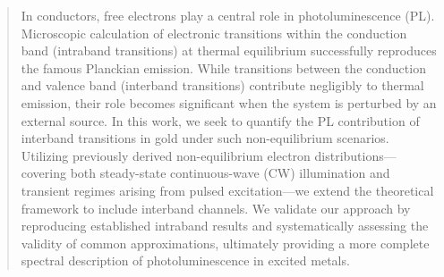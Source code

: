 \begin{abstract}
In conductors, free electrons play a central role in photoluminescence (PL). Microscopic calculation of electronic transitions within the conduction band (intraband transitions) at thermal equilibrium successfully reproduces the famous Planckian emission. While transitions between the conduction and valence band (interband transitions) contribute negligibly to thermal emission, their role becomes significant when the system is perturbed by an external source. In this work, we seek to quantify the PL contribution of interband transitions in gold under such non-equilibrium scenarios. Utilizing previously derived non-equilibrium electron distributions---covering both steady-state continuous-wave (CW) illumination and transient regimes arising from pulsed excitation---we extend the theoretical framework to include interband channels. We validate our approach by reproducing established intraband results and systematically assessing the validity of common approximations, ultimately providing a more complete spectral description of photoluminescence in excited metals.
\end{abstract}
